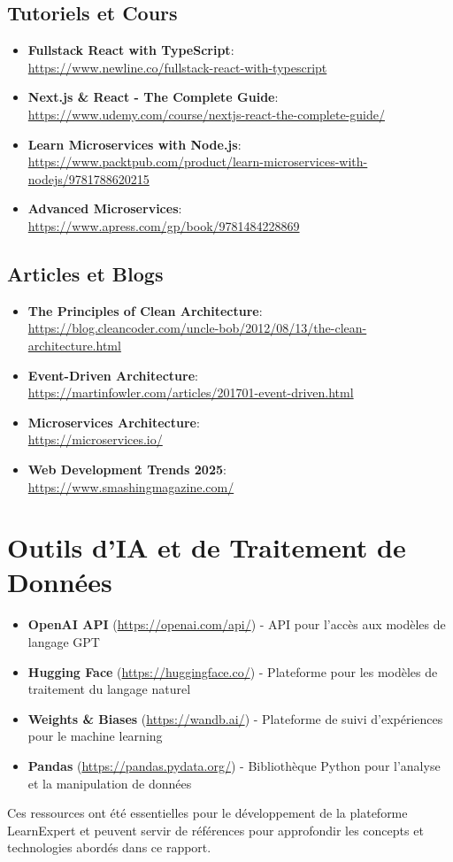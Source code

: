 \documentclass[12pt, a4paper]{report}
\begin{document}
\subsection{Tutoriels et Cours}
\begin{itemize}
  \item \textbf{Fullstack React with TypeScript}: \\
        \url{https://www.newline.co/fullstack-react-with-typescript}
  \item \textbf{Next.js \& React - The Complete Guide}: \\
        \url{https://www.udemy.com/course/nextjs-react-the-complete-guide/}
  \item \textbf{Learn Microservices with Node.js}: \\
        \url{https://www.packtpub.com/product/learn-microservices-with-nodejs/9781788620215}
  \item \textbf{Advanced Microservices}: \\
        \url{https://www.apress.com/gp/book/9781484228869}
\end{itemize}

\subsection{Articles et Blogs}
\begin{itemize}
  \item \textbf{The Principles of Clean Architecture}: \\
        \url{https://blog.cleancoder.com/uncle-bob/2012/08/13/the-clean-architecture.html}
  \item \textbf{Event-Driven Architecture}: \\
        \url{https://martinfowler.com/articles/201701-event-driven.html}
  \item \textbf{Microservices Architecture}: \\
        \url{https://microservices.io/}
  \item \textbf{Web Development Trends 2025}: \\
        \url{https://www.smashingmagazine.com/}
\end{itemize}

\section{Outils d'IA et de Traitement de Données}
\begin{itemize}
  \item \textbf{OpenAI API} (\url{https://openai.com/api/}) - API pour l'accès aux modèles de langage GPT
  \item \textbf{Hugging Face} (\url{https://huggingface.co/}) - Plateforme pour les modèles de traitement du langage naturel
  \item \textbf{Weights \& Biases} (\url{https://wandb.ai/}) - Plateforme de suivi d'expériences pour le machine learning
  \item \textbf{Pandas} (\url{https://pandas.pydata.org/}) - Bibliothèque Python pour l'analyse et la manipulation de données
\end{itemize}

Ces ressources ont été essentielles pour le développement de la plateforme LearnExpert et peuvent servir de références pour approfondir les concepts et technologies abordés dans ce rapport.
\end{document}
